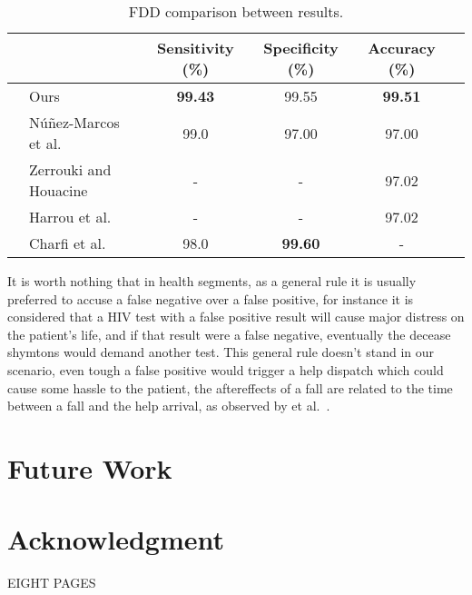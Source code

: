 \documentclass[conference]{IEEEtran}
\begin{document}
\begin{table*}[t]
\centering
\caption{FDD comparison between results.}
\label{tab:fdd-our-their}
\begin{tabular}{llcccl}
\hline
 &                          & Sensitivity (\%)  & Specificity (\%)  & Accuracy (\%)     & \\ \hline
 & Ours                     & \textbf{99.43}    & 99.55             & \textbf{99.51}    & \\
 & N\'u\~nez-Marcos et al.~\cite{nunez2017vision}  & 99.0              & 97.00             & 97.00             & \\
 & Zerrouki and Houacine~\cite{zerrouki2018vision}    & -                 & -                 & 97.02             & \\
 & Harrou et al.~\cite{harrou2017vision}    & -                 & -                 & 97.02             & \\
 & Charfi et al.~\cite{charfi2013optimised}            & 98.0              & \textbf{99.60}    & -                 & \\ \hline
\end{tabular}
\end{table*}

 It is worth nothing that in health segments, as a general rule it is usually preferred to accuse a false negative over a false positive, for instance it is considered that a HIV test with a false positive result will cause major distress on the patient's life, and if that result were a false negative, eventually the decease shymtons would demand another test. This general rule doesn't stand in our scenario, even tough a false positive would trigger a help dispatch which could cause some hassle to the patient, the aftereffects of a fall are related to the time between a fall and the help arrival, as observed by et al.~\cite{}.
 
\section{Future Work}



\section*{Acknowledgment}





\color{red}
\centering
EIGHT PAGES
\end{document}
